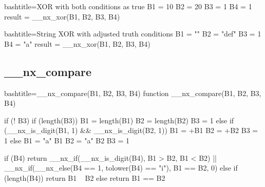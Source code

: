 \begin{NexCodeBox}{bash}{title={XOR with both conditions as true}}
	B1 = 10
	B2 = 20
	B3 = 1
	B4 = 1
	result = __nx_xor(B1, B2, B3, B4)
\end{NexCodeBox}

\begin{NexCodeBox}{bash}{title={String XOR with adjusted truth conditions}}
	B1 = ""
	B2 = "def"
	B3 = 1
	B4 = "a"
	result = __nx_xor(B1, B2, B3, B4)
\end{NexCodeBox}

\newpage
\subsection{__nx_compare}
\label{__nx_compare}
\begin{NexCodeBox}{bash}{title={__nx_compare(B1, B2, B3, B4)}}
function __nx_compare(B1, B2, B3, B4) {
	if (! B3) {
		if (length(B3)) {
			B1 = length(B1)
			B2 = length(B2)
			B3 = 1
		} else if (__nx_is_digit(B1, 1) && __nx_is_digit(B2, 1)) {
			B1 = +B1
			B2 = +B2
			B3 = 1
		} else {
			B1 = "a" B1
			B2 = "a" B2
			B3 = 1
		}
	}

	if (B4) {
		return __nx_if(__nx_is_digit(B4), B1 > B2, B1 < B2) || __nx_if(__nx_else(B4 == 1, tolower(B4) == "i"), B1 == B2, 0)
	} else if (length(B4)) {
		return B1 ~ B2
	} else {
		return B1 == B2
	}
}
\end{NexCodeBox}

